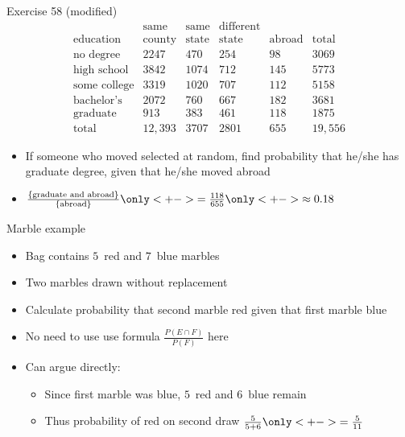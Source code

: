 \documentclass[handout]{beamer}
\theoremstyle{definition}
\begin{document}
\begin{frame}{Exercise 58 (modified)}
\[\begin{array}{r|llll|l}
&\text{same}&\text{same}&\text{different}&&\\
\text{education}&\text{county}
&\text{state}&\text{state}&\text{abroad}&\text{total}\\\hline
\text{no degree}&2247&470&254&98&3069\\
\text{high school}&3842&1074&712&145&5773\\
\text{some college}&3319&1020&707&112&5158\\
\text{bachelor's}&2072&760&667&182&3681\\
\text{graduate}&913&383&461&118&1875\\\hline
\text{total}&12,393&3707&2801&655&19,556
\end{array}\]
\begin{itemize}
\item If someone who moved selected at random, find probability
that he/she has graduate degree, given that he/she moved abroad
\item $\frac{\left\{\text{graduate and abroad}\right\}}
{\left\{\text{abroad}\right\}}
\only<+->{=\frac{118}{655}}\only<+->{\approx 0.18}$
\end{itemize}
\end{frame}

\begin{frame}{Marble example}
\begin{itemize}
\item Bag contains $5$~red and $7$~blue marbles
\item Two marbles drawn without replacement
\item Calculate probability that second marble red
given that first marble blue
\item No need to use use formula
$\frac{P\left(E\cap F\right)}{P\left(F\right)}$ here
\item Can argue directly:
\begin{itemize}
\item Since first marble was blue, $5$~red and \alert{$6$~blue} remain
\item Thus probability of red on second draw $\frac{5}{5+6}
\only<+->{=\frac{5}{11}}$
\end{itemize}
\end{itemize}
\end{frame}
\end{document}
